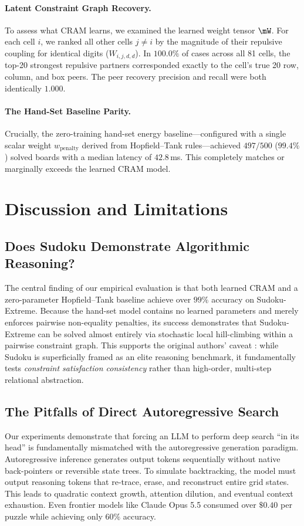 \documentclass{article} %
\begin{document}
\paragraph{Latent Constraint Graph Recovery.}
To assess what CRAM learns, we examined the learned weight tensor $\mW$. For each cell $i$, we ranked all other cells $j \neq i$ by the magnitude of their repulsive coupling for identical digits ($W_{i, j, d, d}$). In $100.0\%$ of cases across all 81 cells, the top-20 strongest repulsive partners corresponded exactly to the cell's true 20 row, column, and box peers. The peer recovery precision and recall were both identically $1.000$.

\paragraph{The Hand-Set Baseline Parity.}
Crucially, the zero-training hand-set energy baseline---configured with a single scalar weight $w_{\mathrm{penalty}}$ derived from Hopfield--Tank rules---achieved $497/500$ ($99.4\%$) solved boards with a median latency of $42.8$\,ms. This completely matches or marginally exceeds the learned CRAM model.

\section{Discussion and Limitations}
\label{sec:discussion}

\subsection{Does Sudoku Demonstrate Algorithmic Reasoning?}
The central finding of our empirical evaluation is that both learned CRAM and a zero-parameter Hopfield--Tank baseline achieve over $99\%$ accuracy on Sudoku-Extreme. Because the hand-set model contains no learned parameters and merely enforces pairwise non-equality penalties, its success demonstrates that Sudoku-Extreme can be solved almost entirely via stochastic local hill-climbing within a pairwise constraint graph. This supports the original authors' caveat \citep{hoover2026classical}: while Sudoku is superficially framed as an elite reasoning benchmark, it fundamentally tests \textit{constraint satisfaction consistency} rather than high-order, multi-step relational abstraction.

\subsection{The Pitfalls of Direct Autoregressive Search}
Our experiments demonstrate that forcing an LLM to perform deep search ``in its head'' is fundamentally mismatched with the autoregressive generation paradigm. Autoregressive inference generates output tokens sequentially without native back-pointers or reversible state trees. To simulate backtracking, the model must output reasoning tokens that re-trace, erase, and reconstruct entire grid states. This leads to quadratic context growth, attention dilution, and eventual context exhaustion. Even frontier models like Claude Opus 5.5 consumed over $\$0.40$ per puzzle while achieving only $60\%$ accuracy.
\end{document}
